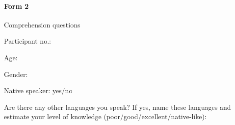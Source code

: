 \documentclass[output=paper]{langsci/langscibook}
\begin{document}
\begin{subappendices}

\paragraph*{Form 2} Comprehension questions%
{\small

\noindent Participant no.: \underline{\hphantom{3em}}

\noindent Age: \underline{\hphantom{3em}}

\noindent Gender: \underline{\hphantom{3em}}

\noindent Native  speaker: yes/no

\noindent Are there any other languages you speak? If yes, name these languages and estimate your level of knowledge (poor/good/excellent/native-like): \underline{\hphantom{3em}}

}
\end{subappendices}
\end{document}
